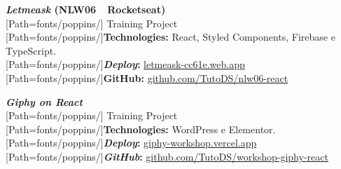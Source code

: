 \vspace{10pt}

\begin{minipage}[t]{.4\textwidth}
\textbf{\textit{Letmeask} {\footnotesize(NLW06~\textemdash~Rocketseat)}}\\
{
	\scriptsize
	[Path=fonts/poppins/]
	Training Project\\
	{[Path=fonts/poppins/]\textbf{Technologies:}} React, Styled Components, Firebase e TypeScript.\\
	{[Path=fonts/poppins/]\textbf{\textit{Deploy}:}} \href{https://letmeask-cc61e.web.app/}{letmeask-cc61e.web.app}\\
	{[Path=fonts/poppins/]\textbf{GitHub:}} \href{https://github.com/TutoDS/nlw06-react}{github.com/TutoDS/nlw06-react}
}
\end{minipage}\hspace{0.1\textwidth}
\begin{minipage}[t]{.4\textwidth}
\textbf{\textit{Giphy on React}}\\
{
	\scriptsize
	[Path=fonts/poppins/]
	Training Project\\
	{[Path=fonts/poppins/]\textbf{Technologies:}} WordPress e Elementor.\\
	{[Path=fonts/poppins/]\textbf{\textit{Deploy}:}} \href{https://giphy-workshop.vercel.app}{giphy-workshop.vercel.app}\\
	{[Path=fonts/poppins/]\textbf{\textit{GitHub}:}} \href{https://github.com/TutoDS/workshop-giphy-react}{github.com/TutoDS/workshop-giphy-react}\\
}
\end{minipage}

\vspace{5pt}